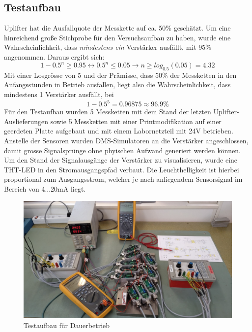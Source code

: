 \documentclass[12pt,a4paper]{article}
\begin{document}
	\subsection{Testaufbau}
	Uplifter hat die Ausfallquote der Messkette auf ca. 50\% geschätzt. Um eine hinreichend große Stichprobe für den Versuchsaufbau zu haben, wurde eine Wahrscheinlichkeit, dass \textit{mindestens ein} Verstärker ausfällt, mit 95\% angenommen. Daraus ergibt sich:
	\begin{equation}
		1 - 0.5^n \ge 0.95 \leftrightarrow 0.5^n  \le 0.05 \rightarrow n \ge log_{0.5}(0.05) = 4.32
	\end{equation} 
	Mit einer Losgrösse von 5 und der Prämisse, dass 50\% der Messketten in den Anfangsstunden in Betrieb ausfallen, liegt also die Wahrscheinlichkeit, dass mindestens 1 Verstärker ausfällt, bei 
	\begin{equation}
		1-0.5^5 = 0.96875 \approx 96.9\%
	\end{equation}
	Für den Testaufbau wurden 5 Messketten mit dem Stand der letzten Uplifter-Auslieferungen sowie 5 Messketten mit einer Printmodifikation auf einer geerdeten Platte aufgebaut und mit einem Labornetzteil mit 24V betrieben. Anstelle der Sensoren wurden DMS-Simulatoren an die Verstärker angeschlossen, damit grosse Signalsprünge ohne phyischen Aufwand generiert werden können.\\
	Um den Stand der Signalausgänge der Verstärker zu visualisieren, wurde eine THT-LED in den Stromausgangspfad verbaut. Die Leuchthelligkeit ist hierbei proportional zum Ausgangsstrom, welcher je nach anliegendem Sensorsignal im Bereich von 4...20mA liegt.\\
	\begin{figure}[H]
		\centering
		\includegraphics[width=1\linewidth]{imgs/Uplifter_Aufbau_1}
		\caption{Testaufbau für Dauerbetrieb}
		\label{fig:uplifteraufbau1}
	\end{figure}\noindent
\end{document}
